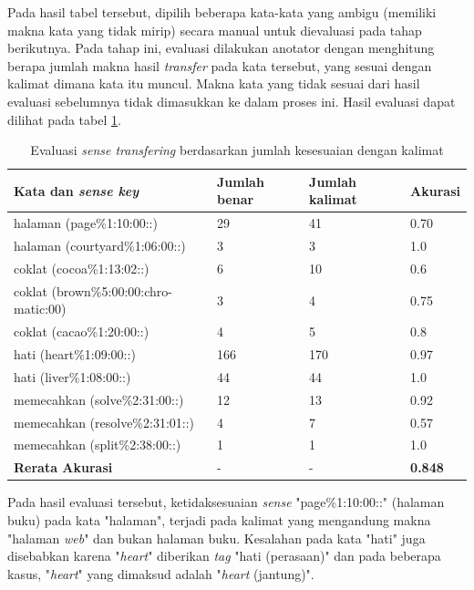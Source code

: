 Pada hasil tabel tersebut, dipilih beberapa kata-kata yang ambigu (memiliki makna kata yang tidak mirip) secara manual untuk dievaluasi pada tahap berikutnya. Pada tahap ini, evaluasi dilakukan anotator dengan menghitung berapa jumlah makna hasil \textit{transfer} pada kata tersebut, yang sesuai dengan kalimat dimana kata itu muncul. Makna kata yang tidak sesuai dari hasil evaluasi sebelumnya tidak dimasukkan ke dalam proses ini. Hasil evaluasi dapat dilihat pada tabel \ref{table:evaluasi-sense-transfer-2}.

\begin{table}
	\centering
	\caption{Evaluasi \textit{sense transfering} berdasarkan jumlah kesesuaian dengan kalimat}
	\label{table:evaluasi-sense-transfer-2}
	\begin{tabular}{|p{4cm}|p{2.85cm}|p{2.85cm}|p{1.4cm}|}
		\hline
		\textbf{Kata dan \textit{sense key}} & \textbf{Jumlah benar} & \textbf{Jumlah kalimat} & \textbf{Akurasi}
		\\ \hline
		halaman (page\%1:10:00::) & 29 & 41 & 0.70 \\ \hline
		halaman (courtyard\%1:06:00::) & 3 & 3 & 1.0 \\ \hline
		coklat (cocoa\%1:13:02::) & 6 & 10 & 0.6 \\ \hline
		coklat (brown\%5:00:00:chro-matic:00) & 3 & 4 & 0.75 \\ \hline
		coklat (cacao\%1:20:00::) & 4 & 5 & 0.8 \\ \hline
		hati (heart\%1:09:00::) & 166 & 170 & 0.97 \\ \hline
		hati (liver\%1:08:00::) & 44 & 44 & 1.0 \\ \hline
		memecahkan (solve\%2:31:00::) & 12 & 13 & 0.92 \\ \hline
		memecahkan (resolve\%2:31:01::) & 4 & 7 & 0.57 \\ \hline
		memecahkan (split\%2:38:00::) & 1 & 1 & 1.0 \\ \hline
		\hline
		\textbf{Rerata Akurasi} & - & - & \textbf{0.848} \\ \hline
	\end{tabular}
\end{table}

Pada hasil evaluasi tersebut, ketidaksesuaian \textit{sense} "page\%1:10:00::" (halaman buku) pada kata "halaman", terjadi pada kalimat yang mengandung makna "halaman \textit{web}" dan bukan halaman buku. Kesalahan pada kata "hati" juga disebabkan karena "\textit{heart}" diberikan \textit{tag} "hati (perasaan)" dan pada beberapa kasus, "\textit{heart}" yang dimaksud adalah "\textit{heart} (jantung)".
 
